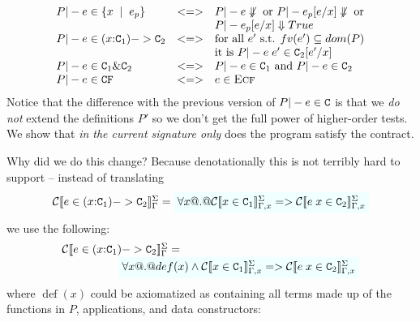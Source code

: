 \documentclass[preprint,nocopyrightspace]{sigplanconf}
\begin{document}
{\setlength{\arraycolsep}{2pt}
\[\begin{array}{lcl}
    P |- e \in \{ x\;\mid\;e_p\} & <=> & P |- e \not\Downarrow \mbox{ or } P |- e_p[e/x] \not\Downarrow \mbox{ or} \\ 
                                 &     & P |- e_p[e/x] \Downarrow True \\
    P |- e \in (x{:}{\tt C}_1) -> {\tt C}_2 & <=> & 
                                 \mbox{for all } e' \mbox{ s.t. } fv(e') \subseteq dom(P)  \\ 
                                   &   &  \mbox{it is } P |- e\;e' \in {\tt C}_2[e'/x] \\
    P |- e \in {\tt C}_1 \& {\tt C}_2 & <=> & P |- e \in {\tt C}_1 \mbox{ and } P |- e \in {\tt C}_2 \\
    P |- e \in {\tt CF}            & <=> & e \in \textsc{Ecf} 
\end{array}\]}
Notice that the difference with the previous version of $P |- e \in {\tt C}$ is that we {\em do not} extend the 
definitions $P'$ so we don't get the full power of higher-order tests. We show that {\em in the current signature
only} does the program satisfy the contract. 

\newcommand{\definable}[1]{{\mathop{def}}(#1)}

Why did we do this change? Because denotationally this is not terribly hard to support -- instead of translating 
\[\begin{array}{l}
  \ctrans{\Sigma}{\Gamma}{e \in (x{:}\Ct_1) -> \Ct_2} =  
  \formula{\forall x @.@ \ctrans{\Sigma}{\Gamma,x}{x \in \Ct_1} => \ctrans{\Sigma}{\Gamma,x}{e\;x \in \Ct_2}}
\end{array}\] 
we use the following:
\[\begin{array}{l}
  \ctrans{\Sigma}{\Gamma}{e \in (x{:}\Ct_1) -> \Ct_2} = \\ 
  \qquad\qquad\quad 
\formula{\forall x @.@ \definable{x} \land \ctrans{\Sigma}{\Gamma,x}{x \in \Ct_1} => \ctrans{\Sigma}{\Gamma,x}{e\;x \in \Ct_2}}
\end{array}\] 
where $\definable{x}$ could be axiomatized as containing all terms 
made up of the functions in $P$, applications, and data constructors:
\end{document}
